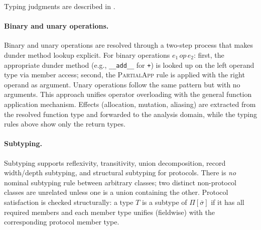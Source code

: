 Typing judgments are described in .

\paragraph{Binary and unary operations.}
Binary and unary operations are resolved through a two-step process that makes dunder method lookup explicit. For binary operations $e_1 \mathit{\,op\,} e_2$: first, the appropriate dunder method (e.g., \texttt{\_\_add\_\_} for \texttt{+}) is looked up on the left operand type via member access; second, the \textsc{PartialApp} rule is applied with the right operand as argument. Unary operations follow the same pattern but with no arguments. This approach unifies operator overloading with the general function application mechanism. Effects (allocation, mutation, aliasing) are extracted from the resolved function type and forwarded to the analysis domain, while the typing rules above show only the return types.

\paragraph{Subtyping.}  
Subtyping supports reflexivity, transitivity, union decomposition, record width/depth subtyping, and structural subtyping for protocols.  
There is \emph{no} nominal subtyping rule between arbitrary classes; two distinct non-protocol classes are unrelated unless one is a union containing the other.  
Protocol satisfaction is checked structurally: a type $T$ is a subtype of $\Pi[\overline{\sigma}]$ if it has all required members and each member type unifies (fieldwise) with the corresponding protocol member type.

